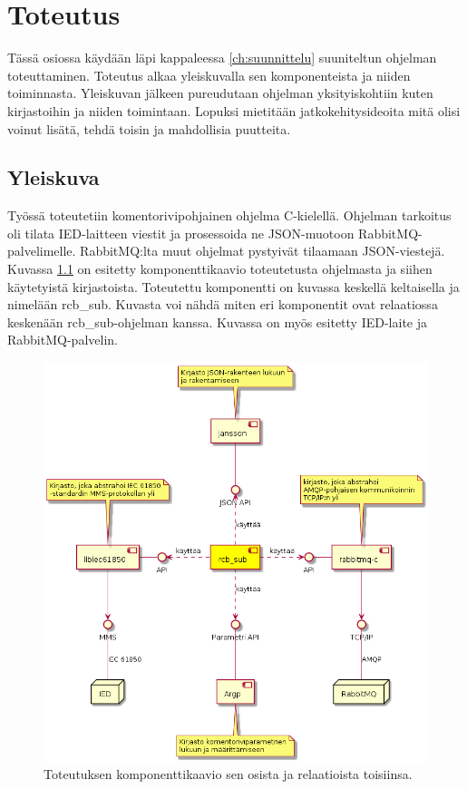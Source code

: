 \chapter{Toteutus}
\label{ch:toteutus}
Tässä osiossa käydään läpi kappaleessa \ref{ch:suunnittelu} suuniteltun ohjelman toteuttaminen. Toteutus alkaa yleiskuvalla sen komponenteista ja niiden toiminnasta. Yleiskuvan jälkeen pureudutaan ohjelman yksityiskohtiin kuten kirjastoihin ja niiden toimintaan. Lopuksi mietitään jatkokehitysideoita mitä olisi voinut lisätä, tehdä toisin ja mahdollisia puutteita.


\section{Yleiskuva}
Työssä toteutetiin komentorivipohjainen ohjelma C-kielellä. Ohjelman tarkoitus oli tilata IED-laitteen viestit ja prosessoida ne JSON-muotoon RabbitMQ-palvelimelle. RabbitMQ:lta muut ohjelmat pystyivät tilaamaan JSON-viestejä. Kuvassa \ref{fig:rcb-sub-komponenttikaavio} on esitetty komponenttikaavio  toteutetusta ohjelmasta ja siihen käytetyistä kirjastoista. Toteutettu komponentti on kuvassa keskellä keltaisella ja nimelään rcb\_sub. Kuvasta voi nähdä miten eri komponentit ovat relaatiossa keskenään rcb\_sub-ohjelman kanssa. Kuvassa on myös esitetty IED-laite ja RabbitMQ-palvelin.

\begin{figure}[ht!]
	\includegraphics[width=1\textwidth]{pictures/rcb-sub-component-diagram.png}
	\caption{Toteutuksen komponenttikaavio sen osista ja relaatioista toisiinsa.}
	\label{fig:rcb-sub-komponenttikaavio}
\end{figure}

